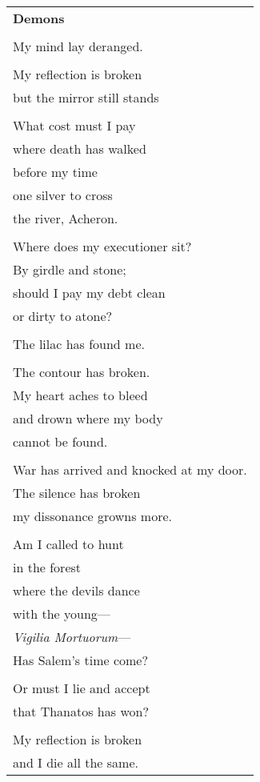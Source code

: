 \documentclass{article}
\begin{document}
\newcommand{\h}{\hspace{3ex}}
\newcommand{\hoar}{%
\begin{center}
\line(1,0){350}
\end{center}
}

\begin{center}
\begin{tabular}{l}
\textbf{Demons} \\
\\
My mind lay deranged. \\
\\
My reflection is broken \\
but the mirror still stands \\
\\
What cost must I pay \\
where death has walked \\
before my time \\
one silver to cross \\
the river, Acheron. \\
\\
Where does my executioner sit? \\
By girdle and stone; \\ %
should I pay my debt clean \\ %
or dirty to atone? \\ %
\\
The lilac has found me. \\
\\
The contour has broken. \\
My heart aches to bleed \\
and drown where my body \\
cannot be found. \\
\\
War has arrived and knocked at my door. \\
The silence has broken \\
my dissonance growns more. \\
\\
Am I called to hunt  \\
in the forest \\
where the devils dance \\
with the young--- \\
\textit{Vigilia Mortuorum}--- \\ %
Has Salem's time come? \\
\\
Or must I lie and accept \\
that Thanatos has won? \\
\\
My reflection is broken \\
and I die all the same. \\ %
\end{tabular}
\end{center}
\end{document}
